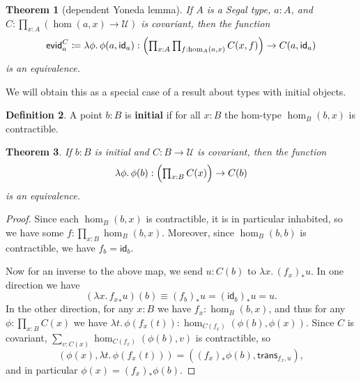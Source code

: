 \documentclass[12pt]{amsart}
\theoremstyle{plain}
\newtheorem{thm}{Theorem}[section]
\theoremstyle{definition}
\newtheorem{defn}[thm]{Definition}
\theoremstyle{remark}
\numberwithin{equation}{section}
\newcommand{\tprod}{\textstyle\prod}
\newcommand{\jdeq}{\equiv}
\newcommand{\defeq}{\coloneqq}
\newcommand{\univtype}{\mathcal{U}}
\newcommand{\evid}{\mathsf{evid}}
\newcommand{\lam}[1]{\lambda #1.\,}
\newcommand{\idarr}[1]{\mathsf{id}_{#1}}
\newcommand{\covtr}[1]{{#1}_*}  %
\newcommand{\istrans}[2]{\mathsf{trans}_{#1,#2}}
\newcommand{\Parens}[1]{\Bigl(#1\Bigr)}
\begin{document}
\begin{thm}[dependent Yoneda lemma]\label{thm:dep-yoneda}
  If $A$ is a Segal type, $a:A$, and $C:\prod_{x:A} (\hom(a,x)\to \univtype)$ is covariant, then the function
  \[ \evid^C_a \defeq \lam{\phi}\phi(a,\idarr a) : \Parens{\tprod_{x:A} \tprod_{f:\hom_A(a,x)} C(x,f)} \to C(a,\idarr a) \]
  is an equivalence.
\end{thm}

We will obtain this as a special case of a result about types with initial objects.

\begin{defn}
  A point $b:B$ is \textbf{initial} if for all $x:B$ the hom-type $\hom_B(b,x)$ is contractible.
\end{defn}

\begin{thm}\label{thm:initial-yoneda}
  If $b:B$ is initial and $C:B\to \univtype$ is covariant, then the function
  \[ \lam{\phi}{\phi(b)} : \Parens{\tprod_{x:B} C(x)} \to C(b) \]
  is an equivalence.
\end{thm}
\begin{proof}
  Since each $\hom_B(b,x)$ is contractible, it is in particular inhabited, so we have some $f:\tprod_{x:B} \hom_B(b,x)$.
  Moreover, since $\hom_B(b,b)$ is contractible, we have $f_b = \idarr b$.

  Now for an inverse to the above map, we send $u:C(b)$ to $\lam{x} \covtr{(f_x)}{u}$.
  In one direction we have
  \[ (\lam{x} \covtr{f_x}{u})(b) \jdeq \covtr{(f_b)}{u} = \covtr{(\idarr b)}{u} = u.\]
  In the other direction, for any $x:B$ we have $f_x : \hom_B(b,x)$, and thus for any $\phi:\tprod_{x:B} C(x)$ we have $\lam{t} \phi(f_x(t)) : \hom_{C(f_x)}(\phi(b),\phi(x))$.
  Since $C$ is covariant, $\sum_{v:C(x)} \hom_{C(f_x)}(\phi(b),v)$ is contractible, so \[(\phi(x),\lam{t} \phi(f_x(t))) = (\covtr{(f_x)}{\phi(b)},\istrans{f_x}{u}),\] and in particular $\phi(x) = \covtr{(f_x)}{\phi(b)}$.
\end{proof}
\end{document}
